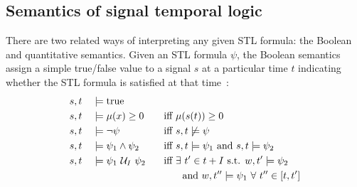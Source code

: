 \subsection{Semantics of signal temporal logic}

There are two related ways of interpreting any given STL formula: the Boolean and quantitative semantics. Given an STL formula $\psi$, the Boolean semantics assign a simple true/false value to a signal $s$ at a particular time $t$ indicating whether the STL formula is satisfied at that time~\cite{donzeEfficientRobustMonitoring2013a}:
\begin{alignat*}{3}
	 & s, t &  & \models \text{true}              &  &                                                                            \\
	 & s, t &  & \models \mu(x) \geq 0\quad       &  & \text{iff}\ \mu(s(t)) \geq 0                                               \\
	 & s, t &  & \models \neg \psi                &  & \text{iff}\ s, t \not\models \psi                                          \\
	 & s, t &  & \models \psi_1 \wedge \psi_2     &  & \text{iff}\ s, t \models \psi_1 \text{ and } s, t \models \psi_2           \\
	 & s, t &  & \models \psi_1\ \mathcal{U}_I\ \psi_2 &  & \text{iff } \exists\ t' \in t + I \text{ s.t. } w, t' \models \psi_2       \\
	 &      &  &                                  &  & \phantom{iff} \text{ and } w, t'' \models \psi_1\ \forall\ t'' \in [t, t']
\end{alignat*}


